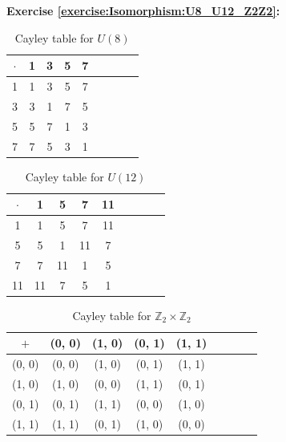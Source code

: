 \noindent\textbf{Exercise \ref{exercise:Isomorphism:U8_U12_Z2Z2}:}
\begin{multicols}{3}
\begin{table}[H]
\caption{Cayley table for $U(8)$}
{\small
\begin{center}
\begin{tabular}{c|cccccccc}
$\cdot$ & 1 & 3 & 5 & 7  \\
\hline
1        & 1 & 3 & 5 & 7  \\
3       & 3 & 1 & 7 & 5  \\
5       & 5 & 7 & 1 & 3 \\
7       & 7 & 5 & 3 & 1 \\
\end{tabular}
\end{center}
}
\end{table}

\begin{table}[H]
\caption{Cayley table for $U(12)$}
{\small
\begin{center}
\begin{tabular}{c|cccccccc}
$\cdot$ & 1 & 5 & 7 & 11  \\
\hline
1        & 1 & 5 & 7 & 11  \\
5       & 5 & 1 & 11 & 7 \\
7       & 7 & 11 & 1 & 5  \\
11      & 11 & 7 & 5 & 1 \\
\end{tabular}
\end{center}
}
\end{table}

\begin{table}[H]
\caption{Cayley table for ${\mathbb Z}_2 \times {\mathbb Z}_2$}
{\small
\begin{center}
\begin{tabular}{c|cccccccc}
$+$ & (0, 0) & (1, 0) & (0, 1) & (1, 1)  \\
\hline
(0, 0)        & (0, 0) & (1, 0) & (0, 1) & (1, 1)  \\
(1, 0)       & (1, 0) & (0, 0) & (1, 1) & (0, 1)  \\
(0, 1)       & (0, 1) & (1, 1) & (0, 0) & (1, 0) \\
(1, 1)       & (1, 1) & (0, 1) & (1, 0) & (0, 0) \\
\end{tabular}
\end{center}
}
\end{table}
\end{multicols}
